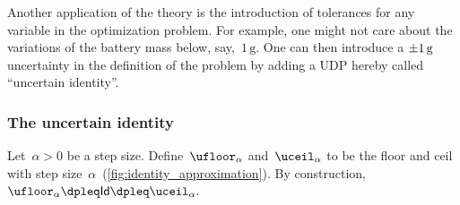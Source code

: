 Another application of the theory is the introduction of tolerances
for any variable in the optimization problem. For example, one might
not care about the variations of the battery mass below, say,~$1\,\text{g}$.
One can then introduce a $\pm1\,\text{\ensuremath{\text{g}} }$ uncertainty
in the definition of the problem by adding a UDP hereby called ``uncertain
identity''.


\subsubsection{The uncertain identity}

Let~$\alpha>0$ be a step size. Define~$\ufloor_{\alpha}$ and~$\uceil_{\alpha}$
to be the floor and ceil with step size~$\alpha$~(\cref{fig:identity_approximation}).
By construction, $\ufloor_{\alpha}\dpleq\mathsf{Id}\dpleq\uceil_{\alpha}.$

